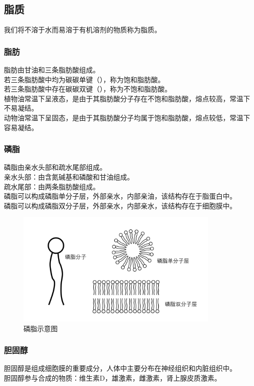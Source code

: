 \documentclass[UTF8]{ctexart}
\begin{document}
\subsection{脂质}
    我们将不溶于水而易溶于有机溶剂的物质称为脂质。

\subsubsection{脂肪}
    脂肪由甘油和三条脂肪酸组成。\\[3mm]
    若三条脂肪酸中均为碳碳单键（），称为饱和脂肪酸。\\[3mm]
    若三条脂肪酸中存在碳碳双键（），称为不饱和脂肪酸。\\[3mm]
    植物油常温下呈液态，是由于其脂肪酸分子存在不饱和脂肪酸，熔点较高，常温下不易凝结。\\[3mm]
    动物油常温下呈固态，是由于其脂肪酸分子均属于饱和脂肪酸，熔点较低，常温下容易凝结。

\subsubsection{磷脂}
    磷脂由亲水头部和疏水尾部组成。\\[3mm]
    亲水头部：由含氮碱基和磷酸和甘油组成。\\[3mm]
    疏水尾部：由两条脂肪酸组成。\\[3mm]
    磷脂可以构成磷脂单分子层，外部亲水，内部亲油，该结构存在于脂蛋白中。\\[3mm]
    磷脂可以构成磷脂双分子层，外部亲水，内部亲水，该结构存在于细胞膜中。
    \begin{figure}[h]
        \begin{center}
            \includegraphics[width=10cm]{BiologyImage/1.jpg}    
            \caption{磷脂示意图}
        \end{center}
    \end{figure}

\subsubsection{胆固醇}
    胆固醇是组成细胞膜的重要成分，人体中主要分布在神经组织和内脏组织中。\\[3mm]
    胆固醇参与合成的物质：维生素D，雄激素，雌激素，肾上腺皮质激素。
\end{document}
